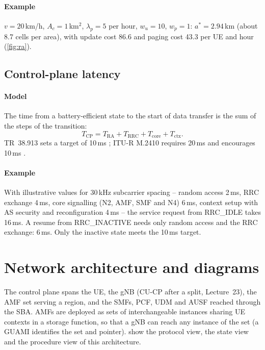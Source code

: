 \documentclass[11pt,a4paper]{article}
\begin{document}
\paragraph{Example} $v = 20$\,km/h, $A_c = 1$\,km$^2$, $\lambda_p = 5$ per hour, $w_u = 10$, $w_p = 1$: $a^{*} = 2.94$\,km (about 8.7 cells per area),
with update cost 86.6 and paging cost 43.3 per UE and hour (\cref{fig:ra}).

\begin{acnfigure}
  \caption{Registration-area size trade-off (\cref{eq:racost,eq:raopt}).}
  \label{fig:ra}
\end{acnfigure}

\subsection{Control-plane latency}\label{sec:cplat}
\paragraph{Model} The time from a battery-efficient state to the start of data transfer is the sum of the steps of the transition:
\begin{equation}\label{eq:cplat}
  T_{\mathrm{CP}} = T_{\mathrm{RA}} + T_{\mathrm{RRC}} + T_{\mathrm{core}} + T_{\mathrm{ctx}} .
\end{equation}
TR~38.913 sets a target of 10\,ms \cite{tr38913}; ITU-R M.2410 requires 20\,ms and encourages 10\,ms \cite{itu2017m2410}.
\paragraph{Example} With illustrative values for 30\,kHz subcarrier spacing -- random access 2\,ms, RRC exchange 4\,ms, core signalling (N2, AMF,
SMF and N4) 6\,ms, context setup with AS security and reconfiguration 4\,ms -- the service request from RRC\_IDLE takes 16\,ms. A resume from
RRC\_INACTIVE needs only random access and the RRC exchange: 6\,ms. Only the inactive state meets the 10\,ms target.

\section{Network architecture and diagrams}
The control plane spans the UE, the gNB (CU-CP after a split, Lecture~23), the AMF set serving a region, and the SMFs, PCF, UDM and AUSF
reached through the SBA. AMFs are deployed as sets of interchangeable instances sharing UE contexts in a storage function, so that a gNB can
reach any instance of the set (a GUAMI identifies the set and pointer).  show the protocol view, the state view and
the procedure view of this architecture.
\end{document}
